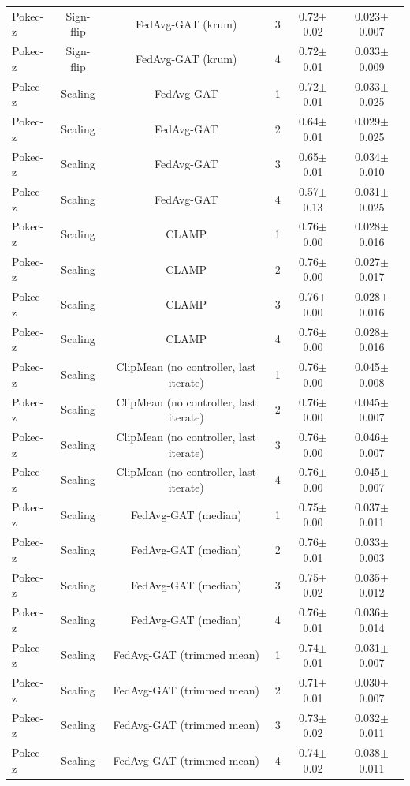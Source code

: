 \begin{table}[tbp]
\begin{tabular}{lccccc}
Pokec-z & Sign-flip & FedAvg-GAT (krum) & 3 & 0.72$\pm$0.02 & 0.023$\pm$0.007 \\
Pokec-z & Sign-flip & FedAvg-GAT (krum) & 4 & 0.72$\pm$0.01 & 0.033$\pm$0.009 \\
Pokec-z & Scaling & FedAvg-GAT & 1 & 0.72$\pm$0.01 & 0.033$\pm$0.025 \\
Pokec-z & Scaling & FedAvg-GAT & 2 & 0.64$\pm$0.01 & 0.029$\pm$0.025 \\
Pokec-z & Scaling & FedAvg-GAT & 3 & 0.65$\pm$0.01 & 0.034$\pm$0.010 \\
Pokec-z & Scaling & FedAvg-GAT & 4 & 0.57$\pm$0.13 & 0.031$\pm$0.025 \\
Pokec-z & Scaling & CLAMP & 1 & 0.76$\pm$0.00 & 0.028$\pm$0.016 \\
Pokec-z & Scaling & CLAMP & 2 & 0.76$\pm$0.00 & 0.027$\pm$0.017 \\
Pokec-z & Scaling & CLAMP & 3 & 0.76$\pm$0.00 & 0.028$\pm$0.016 \\
Pokec-z & Scaling & CLAMP & 4 & 0.76$\pm$0.00 & 0.028$\pm$0.016 \\
Pokec-z & Scaling & ClipMean (no controller, last iterate) & 1 & 0.76$\pm$0.00 & 0.045$\pm$0.008 \\
Pokec-z & Scaling & ClipMean (no controller, last iterate) & 2 & 0.76$\pm$0.00 & 0.045$\pm$0.007 \\
Pokec-z & Scaling & ClipMean (no controller, last iterate) & 3 & 0.76$\pm$0.00 & 0.046$\pm$0.007 \\
Pokec-z & Scaling & ClipMean (no controller, last iterate) & 4 & 0.76$\pm$0.00 & 0.045$\pm$0.007 \\
Pokec-z & Scaling & FedAvg-GAT (median) & 1 & 0.75$\pm$0.00 & 0.037$\pm$0.011 \\
Pokec-z & Scaling & FedAvg-GAT (median) & 2 & 0.76$\pm$0.01 & 0.033$\pm$0.003 \\
Pokec-z & Scaling & FedAvg-GAT (median) & 3 & 0.75$\pm$0.02 & 0.035$\pm$0.012 \\
Pokec-z & Scaling & FedAvg-GAT (median) & 4 & 0.76$\pm$0.01 & 0.036$\pm$0.014 \\
Pokec-z & Scaling & FedAvg-GAT (trimmed mean) & 1 & 0.74$\pm$0.01 & 0.031$\pm$0.007 \\
Pokec-z & Scaling & FedAvg-GAT (trimmed mean) & 2 & 0.71$\pm$0.01 & 0.030$\pm$0.007 \\
Pokec-z & Scaling & FedAvg-GAT (trimmed mean) & 3 & 0.73$\pm$0.02 & 0.032$\pm$0.011 \\
Pokec-z & Scaling & FedAvg-GAT (trimmed mean) & 4 & 0.74$\pm$0.02 & 0.038$\pm$0.011 \\

\end{tabular}
\end{table}
